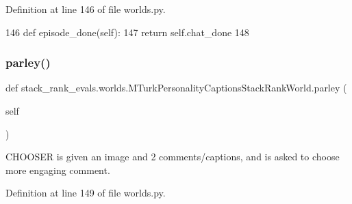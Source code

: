Definition at line 146 of file worlds.\+py.


\begin{DoxyCode}
146     \textcolor{keyword}{def }episode\_done(self):
147         \textcolor{keywordflow}{return} self.chat\_done
148 
\end{DoxyCode}
\mbox{\label{classstack__rank__evals_1_1worlds_1_1MTurkPersonalityCaptionsStackRankWorld_a41817ec1f909df958b73f3b5d810299e}} 
\subsubsection{\texorpdfstring{parley()}{parley()}}
{\footnotesize\ttfamily def stack\+\_\+rank\+\_\+evals.\+worlds.\+M\+Turk\+Personality\+Captions\+Stack\+Rank\+World.\+parley (\begin{DoxyParamCaption}\item[{}]{self }\end{DoxyParamCaption})}

\begin{DoxyVerb}CHOOSER is given an image and 2 comments/captions, and is asked to choose more
engaging comment.
\end{DoxyVerb}
 

Definition at line 149 of file worlds.\+py.


